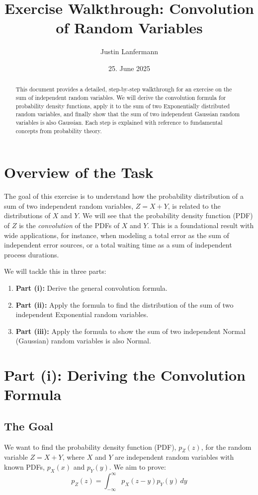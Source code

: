\documentclass[11pt,a4paper]{article}
\title{Exercise Walkthrough: Convolution of Random Variables}
\author{Justin Lanfermann}
\date{25. June 2025}
\begin{document}
\maketitle

\begin{abstract}
    This document provides a detailed, step-by-step walkthrough for an exercise on the sum of independent random variables. We will derive the convolution formula for probability density functions, apply it to the sum of two Exponentially distributed random variables, and finally show that the sum of two independent Gaussian random variables is also Gaussian. Each step is explained with reference to fundamental concepts from probability theory.
\end{abstract}

\section{Overview of the Task}
The goal of this exercise is to understand how the probability distribution of a sum of two independent random variables, $Z = X+Y$, is related to the distributions of $X$ and $Y$. We will see that the probability density function (PDF) of $Z$ is the \textit{convolution} of the PDFs of $X$ and $Y$. This is a foundational result with wide applications, for instance, when modeling a total error as the sum of independent error sources, or a total waiting time as a sum of independent process durations.

We will tackle this in three parts:
\begin{enumerate}
    \item \textbf{Part (i):} Derive the general convolution formula.
    \item \textbf{Part (ii):} Apply the formula to find the distribution of the sum of two independent Exponential random variables.
    \item \textbf{Part (iii):} Apply the formula to show the sum of two independent Normal (Gaussian) random variables is also Normal.
\end{enumerate}

\section{Part (i): Deriving the Convolution Formula}

\subsection{The Goal}
We want to find the probability density function (PDF), $p_Z(z)$, for the random variable $Z = X+Y$, where $X$ and $Y$ are independent random variables with known PDFs, $p_X(x)$ and $p_Y(y)$. We aim to prove:
\[
p_Z(z) = \int_{-\infty}^{\infty} p_X(z-y) p_Y(y) \, dy
\]
\end{document}
